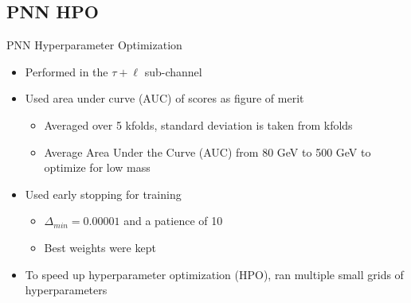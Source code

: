 \documentclass[aspectratio=169,xcolor=table]{beamer}
\begin{document}
  \subsection{ PNN HPO }

    \begin{frame}[t]{PNN Hyperparameter Optimization}
      \begin{itemize}
        \item Performed in the $\tau+\ell$ sub-channel
        \item Used area under curve (AUC) of scores as figure of merit
        \begin{itemize}
          \item Averaged over 5 kfolds, standard deviation is taken from kfolds
          \item Average Area Under the Curve (AUC) from 80 GeV to 500 GeV to optimize for low mass
        \end{itemize}
          \item Used early stopping for training
          \begin{itemize}
            \item $\Delta_{min}=0.00001$ and a patience of 10
            \item Best weights were kept
          \end{itemize}
        \item To speed up hyperparameter optimization (HPO), ran multiple small grids of hyperparameters
        \begin{itemize}
\end{itemize}
\end{itemize}
\end{frame}
\end{document}
